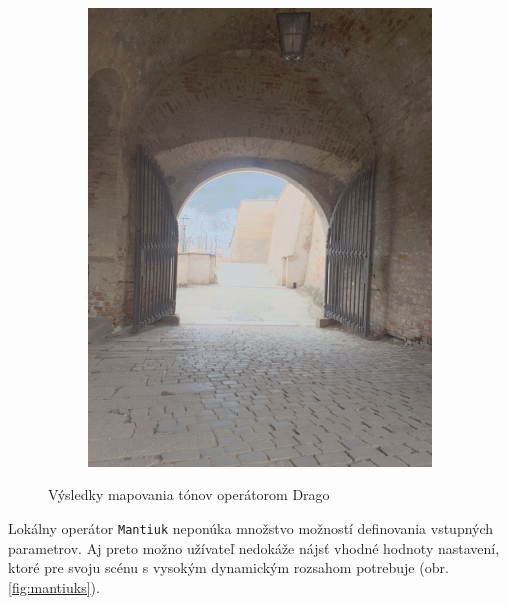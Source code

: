 \begin{figure}[h!]
\begin{subfigure}{0.3\textwidth}
      \includegraphics[width=\textwidth]{figures/tests/tmo/drag2}
  \end{subfigure}
  \caption{Výsledky mapovania tónov operátorom Drago}
  \label{fig:dragos}
\end{figure}

Lokálny operátor \texttt{Mantiuk} neponúka množstvo možností definovania vstupných parametrov. Aj preto možno užívateľ
nedokáže nájsť vhodné hodnoty nastavení, ktoré pre svoju scénu s vysokým dynamickým rozsahom potrebuje (obr.
\ref{fig:mantiuks}).

